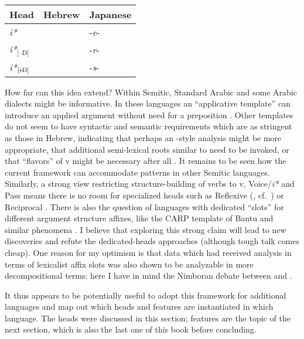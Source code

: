 \ex\label{ex:heads-langs2}
	\begin{tabular}{l|ll}
	Head 		& Hebrew 	  		& Japanese\\\hline
	\emph{i*}   	& \tkal          & -\emph{e}-\\
	\emph{i*}$_{\text{[--D]}}$ 	& \tnif 		& -\emph{r}-\\
	\emph{i*}$_{\text{[\!+\!D]}}$	& \thif		& -\emph{s}-\\
	\end{tabular}
\xe

How far can this idea extend? Within Semitic, Standard Arabic and some Arabic dialects might be informative. In these languages an ``applicative template'' can introduce an applied argument without need for a preposition \citep{alkaabi15phd}. Other templates do not seem to have syntactic and semantic requirements which are as stringent as those in Hebrew, indicating that perhaps an \citeauthor{arad05}-style analysis might be more appropriate, that additional semi-lexical roots similar to {\va} need to be invoked, or that ``flavors'' of v might be necessary after all \citep{katie13}. It remains to be seen how the current framework can accommodate patterns in other Semitic languages. Similarly, a strong view restricting structure-building of verbs to v, Voice/\textit{i*} and Pass means there is no room for specialized heads such as Reflexive (\citealt{ahn15phd}, cf.~\citealt{spathas17camvoice,spathas17debrecen}) or Reciprocal \citep{bruening04}. There is also the question of languages with dedicated ``slots'' for different argument structure affixes, like the CARP template of Bantu and similar phenomena \citep{hyman03,paster05}. I believe that exploring this strong claim will lead to new discoveries and refute the dedicated-heads approaches (although tough talk comes cheap). One reason for my optimism is that data which had received analysis in terms of lexicalist affix slots was also shown to be analyzable in more decompositional terms; here I have in mind the Nimboran debate between \cite{inkelas93} and \cite{noyer98}.

It thus appears to be potentially useful to adopt this framework for additional languages and map out which heads and features are instantiated in which language. The heads were discussed in this section; features are the topic of the next section, which is also the last one of this book before concluding.



